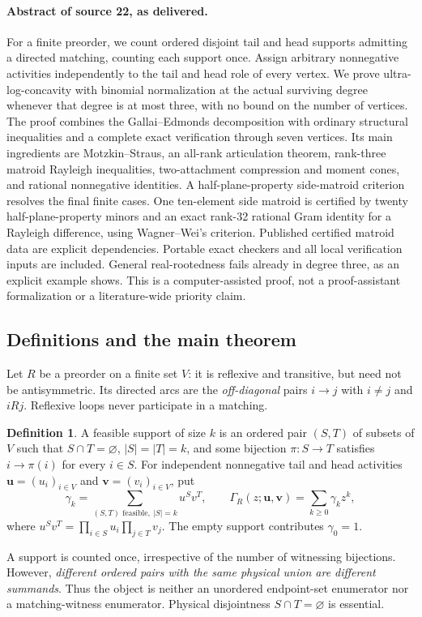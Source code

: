\documentclass[11pt]{article}
\numberwithin{equation}{section}
\theoremstyle{definition}\newtheorem{definition}[theorem]{Definition}\newtheorem{remark}[theorem]{Remark}
\newcommand{\Ga}{\Gamma}                   %
\begin{document}
\paragraph{Abstract of source 22, as delivered.}

For a finite preorder, we count ordered disjoint tail and head supports admitting a directed matching, counting each support once. Assign arbitrary nonnegative activities independently to the tail and head role of every vertex. We prove ultra-log-concavity with binomial normalization at the actual surviving degree whenever that degree is at most three, with no bound on the number of vertices. The proof combines the Gallai--Edmonds decomposition with ordinary structural inequalities and a complete exact verification through seven vertices. Its main ingredients are Motzkin--Straus, an all-rank articulation theorem, rank-three matroid Rayleigh inequalities, two-attachment compression and moment cones, and rational nonnegative identities. A half-plane-property side-matroid criterion resolves the final finite cases. One ten-element side matroid is certified by twenty half-plane-property minors and an exact rank-32 rational Gram identity for a Rayleigh difference, using Wagner--Wei's criterion. Published certified matroid data are explicit dependencies. Portable exact checkers and all local verification inputs are included. General real-rootedness fails already in degree three, as an explicit example shows. This is a computer-assisted proof, not a proof-assistant formalization or a literature-wide priority claim.

\subsection{Definitions and the main theorem}\label{pgr:r:ir:sec:main}
Let $R$ be a preorder on a finite set $V$: it is reflexive and transitive, but need not be antisymmetric. Its directed arcs are the \emph{off-diagonal} pairs $i\to j$ with $i\ne j$ and $iRj$. Reflexive loops never participate in a matching.

\begin{definition}
A feasible support of size $k$ is an ordered pair $(S,T)$ of subsets of $V$ such that $S\cap T=\varnothing$, $|S|=|T|=k$, and some bijection $\pi:S\to T$ satisfies $i\to\pi(i)$ for every $i\in S$. For independent nonnegative tail and head activities $\mathbf u=(u_i)_{i\in V}$ and $\mathbf v=(v_i)_{i\in V}$, put
\begin{equation}\label{pgr:r:ir:eq:roledef}
 \gamma_k=\sum_{(S,T)\text{ feasible},\ |S|=k}u^Sv^T,
 \qquad \Ga_R(z;\mathbf u,\mathbf v)=\sum_{k\ge0}\gamma_k z^k,
\end{equation}
where $u^Sv^T=\prod_{i\in S}u_i\prod_{j\in T}v_j$. The empty support contributes $\gamma_0=1$.
\end{definition}
A support is counted once, irrespective of the number of witnessing bijections. However, \emph{different ordered pairs with the same physical union are different summands}. Thus the object is neither an unordered endpoint-set enumerator nor a matching-witness enumerator. Physical disjointness $S\cap T=\varnothing$ is essential.
\end{document}
